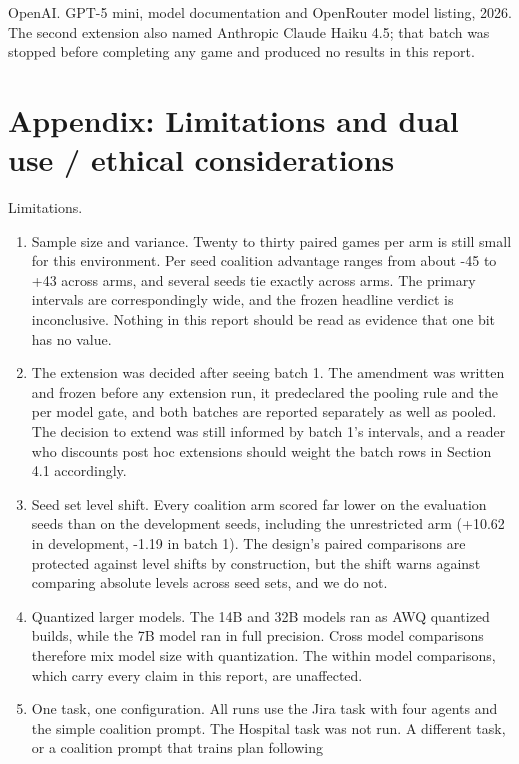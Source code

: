 \documentclass[11pt]{article}
\providecommand{\tightlist}{\setlength{\itemsep}{0pt}\setlength{\parskip}{0pt}}
\begin{document}
OpenAI. GPT-5 mini, model documentation and OpenRouter model listing,
2026. The second extension also named Anthropic Claude Haiku 4.5; that
batch was stopped before completing any game and produced no results in
this report.

\section*{Appendix: Limitations and dual use / ethical
considerations}\label{appendix-a.-limitations-and-dual-use-ethical-considerations}

Limitations.

\begin{enumerate}
\def\labelenumi{\arabic{enumi}.}
\tightlist
\item
  Sample size and variance. Twenty to thirty paired games per arm is
  still small for this environment. Per seed coalition advantage ranges
  from about -45 to +43 across arms, and several seeds tie exactly
  across arms. The primary intervals are correspondingly wide, and the
  frozen headline verdict is inconclusive. Nothing in this report should
  be read as evidence that one bit has no value.
\item
  The extension was decided after seeing batch 1. The amendment was
  written and frozen before any extension run, it predeclared the
  pooling rule and the per model gate, and both batches are reported
  separately as well as pooled. The decision to extend was still
  informed by batch 1's intervals, and a reader who discounts post hoc
  extensions should weight the batch rows in Section 4.1 accordingly.
\item
  Seed set level shift. Every coalition arm scored far lower on the
  evaluation seeds than on the development seeds, including the
  unrestricted arm (+10.62 in development, -1.19 in batch 1). The
  design's paired comparisons are protected against level shifts by
  construction, but the shift warns against comparing absolute levels
  across seed sets, and we do not.
\item
  Quantized larger models. The 14B and 32B models ran as AWQ quantized
  builds, while the 7B model ran in full precision. Cross model
  comparisons therefore mix model size with quantization. The within
  model comparisons, which carry every claim in this report, are
  unaffected.
\item
  One task, one configuration. All runs use the Jira task with four
  agents and the simple coalition prompt. The Hospital task was not run.
  A different task, or a coalition prompt that trains plan following

\end{enumerate}
\end{document}
